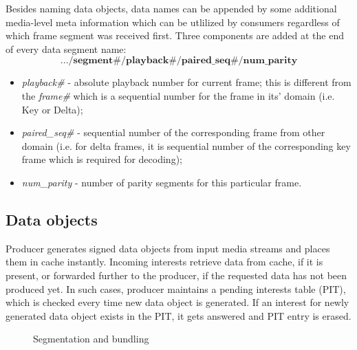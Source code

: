 \documentclass[10pt]{icn/sig-alternate-10pt} %
\begin{document}
Besides naming data objects, data names can be appended by some additional media-level meta information which can be utlilized by consumers regardless of which frame segment was received first. Three components are added at the end of every data segment name:
\small\begin{equation}
.../\textbf{segment\#}/\textbf{playback\#}/\textbf{paired\_seq\#}/\textbf{num\_parity} \nonumber
\end{equation}\normalsize
\begin{itemize}
\item \textit{playback\#} - absolute playback number for current frame; this is different from the \textit{frame\#} which is a sequential number for the frame in its' domain (i.e. Key or Delta);
\item \textit{paired\_seq\#} - sequential number of the corresponding frame from other domain (i.e. for delta frames, it is sequential number of the corresponding key frame which is required for decoding);
\item \textit{num\_parity} - number of parity segments for this particular frame.
\end{itemize}


\subsection{Data objects}
Producer generates signed data objects from input media streams and places them in cache instantly. Incoming interests retrieve data from cache, if it is present, or forwarded further to the producer, if the requested data has not been produced yet. In such cases, producer maintains a pending interests table (PIT), which is checked every time new data object is generated. If an interest for newly generated data object exists in the PIT, it gets answered and PIT entry is erased.

\begin{figure}[t!]
\centering


\caption{Segmentation and bundling}

\end{figure}
\end{document}
